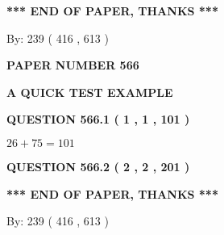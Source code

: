 \documentclass[12pt]{article}
\begin{document}
   
 \vspace{0.2in}
 
   
   
   
   
\vspace{1.0in} 
{\textbf{\large{ *** END OF PAPER, THANKS *** }}} 
   
   
\hspace{1.0in} By: 
 239 ( 416 ,  613 )
   
   
   
   
\newpage 
\setcounter{page}{ 
   566001 } 
   
   
   
   
 {\textbf{ \Large{ PAPER NUMBER  566  }}}
   
   
\vspace{0.2in}
   
   
   
   
   
   
 \vspace{0.2in}
{\LARGE {\textbf{ A QUICK TEST EXAMPLE}}}
   
   
  
\vspace{0.2in}
  
{\textbf{\Large{QUESTION
566.1 
 ( 1 , 1 , 101 )
}}}
  
  
 
 

$ %
26 +  %
75=   %
101$
 
 
  
\vspace{0.2in}
  
{\textbf{\Large{QUESTION
566.2 
 ( 2 , 2 , 201 )
}}}
  
  
   
   
 \vspace{0.2in}
 
   
   
   
   
\vspace{1.0in} 
{\textbf{\large{ *** END OF PAPER, THANKS *** }}} 
   
   
\hspace{1.0in} By: 
 239 ( 416 ,  613 )
   
   
   
   
\newpage 
\setcounter{page}{ 
   567001 } 
   
   
   
\end{document}
